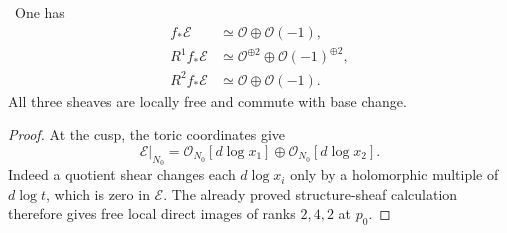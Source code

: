 \begin{proposition}
\label{prop:log-relative-direct-images}
\Verified\ One has
\begin{align*}
 f_*\mathcal E&\simeq\mathcal O\oplus\mathcal O(-1),\\
 R^1f_*\mathcal E&\simeq
       \mathcal O^{\oplus2}\oplus\mathcal O(-1)^{\oplus2},\\
 R^2f_*\mathcal E&\simeq\mathcal O\oplus\mathcal O(-1).
\end{align*}
All three sheaves are locally free and commute with base change.
\end{proposition}

\begin{proof}
At the cusp, the toric coordinates give
\[
 \mathcal E|_{N_0}
 =\mathcal O_{N_0}[d\log x_1]\oplus
  \mathcal O_{N_0}[d\log x_2].
\tag{11.3}
\]
Indeed a quotient shear changes each $d\log x_i$ only by a holomorphic
multiple of $d\log t$, which is zero in $\mathcal E$.  The already proved
structure-sheaf calculation therefore gives free local direct images of
ranks $2,4,2$ at $p_0$.


\end{proof}
